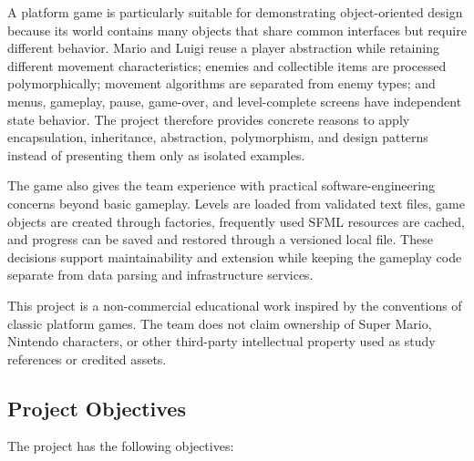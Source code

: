 \documentclass{template}
\begin{document}
A platform game is particularly suitable for demonstrating object-oriented
design because its world contains many objects that share common interfaces
but require different behavior. Mario and Luigi reuse a player abstraction
while retaining different movement characteristics; enemies and collectible
items are processed polymorphically; movement algorithms are separated from
enemy types; and menus, gameplay, pause, game-over, and level-complete screens
have independent state behavior. The project therefore provides concrete
reasons to apply encapsulation, inheritance, abstraction, polymorphism, and
design patterns instead of presenting them only as isolated examples.

The game also gives the team experience with practical software-engineering
concerns beyond basic gameplay. Levels are loaded from validated text files,
game objects are created through factories, frequently used SFML resources are
cached, and progress can be saved and restored through a versioned local file.
These decisions support maintainability and extension while keeping the
gameplay code separate from data parsing and infrastructure services.

This project is a non-commercial educational work inspired by the conventions
of classic platform games. The team does not claim ownership of Super Mario,
Nintendo characters, or other third-party intellectual property used as study
references or credited assets.

\subsection{Project Objectives}

The project has the following objectives:
\end{document}
